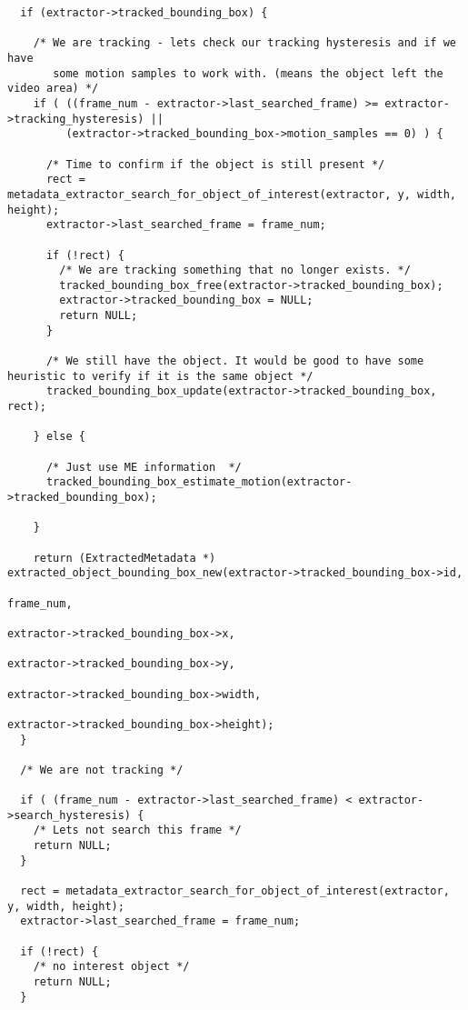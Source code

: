 \begin{lstlisting}
  if (extractor->tracked_bounding_box) {

    /* We are tracking - lets check our tracking hysteresis and if we have 
       some motion samples to work with. (means the object left the video area) */
    if ( ((frame_num - extractor->last_searched_frame) >= extractor->tracking_hysteresis) ||
         (extractor->tracked_bounding_box->motion_samples == 0) ) {

      /* Time to confirm if the object is still present */
      rect = metadata_extractor_search_for_object_of_interest(extractor, y, width, height);
      extractor->last_searched_frame = frame_num;

      if (!rect) {
        /* We are tracking something that no longer exists. */
        tracked_bounding_box_free(extractor->tracked_bounding_box);
        extractor->tracked_bounding_box = NULL;
        return NULL;
      }

      /* We still have the object. It would be good to have some heuristic to verify if it is the same object */
      tracked_bounding_box_update(extractor->tracked_bounding_box, rect);

    } else {

      /* Just use ME information  */
      tracked_bounding_box_estimate_motion(extractor->tracked_bounding_box);

    }

    return (ExtractedMetadata *) extracted_object_bounding_box_new(extractor->tracked_bounding_box->id, 
                                                                   frame_num, 
                                                                   extractor->tracked_bounding_box->x, 
                                                                   extractor->tracked_bounding_box->y, 
                                                                   extractor->tracked_bounding_box->width, 
                                                                   extractor->tracked_bounding_box->height);
  }

  /* We are not tracking */

  if ( (frame_num - extractor->last_searched_frame) < extractor->search_hysteresis) {
    /* Lets not search this frame */
    return NULL;
  }

  rect = metadata_extractor_search_for_object_of_interest(extractor, y, width, height);
  extractor->last_searched_frame = frame_num;

  if (!rect) {
    /* no interest object */
    return NULL;
  }


\end{lstlisting}
